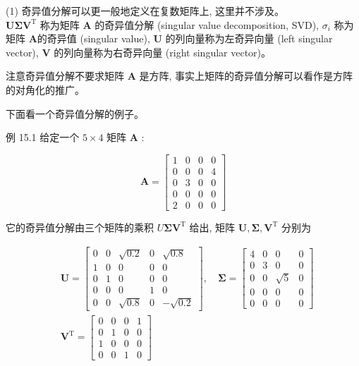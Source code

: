 \documentclass[10pt]{article}
\begin{document}
(1) 奇异值分解可以更一般地定义在复数矩阵上, 这里并不涉及。\\
$\boldsymbol{U} \boldsymbol{\Sigma} \boldsymbol{V}^{\mathrm{T}}$ 称为矩阵 $\boldsymbol{A}$ 的奇异值分解 (singular value decomposition, SVD), $\sigma_{i}$ 称为矩阵 $\boldsymbol{A}$的奇异值 (singular value), $\boldsymbol{U}$ 的列向量称为左奇异向量 (left singular vector), $\boldsymbol{V}$ 的列向量称为右奇异向量 (right singular vector)。

注意奇异值分解不要求矩阵 $\boldsymbol{A}$ 是方阵, 事实上矩阵的奇异值分解可以看作是方阵的对角化的推广。

下面看一个奇异值分解的例子。

例 15.1 给定一个 $5 \times 4$ 矩阵 $\boldsymbol{A}$ :

$$
\boldsymbol{A}=\left[\begin{array}{llll}
1 & 0 & 0 & 0 \\
0 & 0 & 0 & 4 \\
0 & 3 & 0 & 0 \\
0 & 0 & 0 & 0 \\
2 & 0 & 0 & 0
\end{array}\right]
$$

它的奇异值分解由三个矩阵的乘积 $U \boldsymbol{\Sigma} \boldsymbol{V}^{\mathrm{T}}$ 给出, 矩阵 $\boldsymbol{U}, \boldsymbol{\Sigma}, \boldsymbol{V}^{\mathrm{T}}$ 分别为

$$
\begin{aligned}
& \boldsymbol{U}=\left[\begin{array}{ccccc}
0 & 0 & \sqrt{0.2} & 0 & \sqrt{0.8} \\
1 & 0 & 0 & 0 & 0 \\
0 & 1 & 0 & 0 & 0 \\
0 & 0 & 0 & 1 & 0 \\
0 & 0 & \sqrt{0.8} & 0 & -\sqrt{0.2}
\end{array}\right], \quad \boldsymbol{\Sigma}=\left[\begin{array}{cccc}
4 & 0 & 0 & 0 \\
0 & 3 & 0 & 0 \\
0 & 0 & \sqrt{5} & 0 \\
0 & 0 & 0 & 0 \\
0 & 0 & 0 & 0
\end{array}\right] \\
& \boldsymbol{V}^{\mathrm{T}}=\left[\begin{array}{cccc}
0 & 0 & 0 & 1 \\
0 & 1 & 0 & 0 \\
1 & 0 & 0 & 0 \\
0 & 0 & 1 & 0
\end{array}\right]
\end{aligned}
$$
\end{document}
